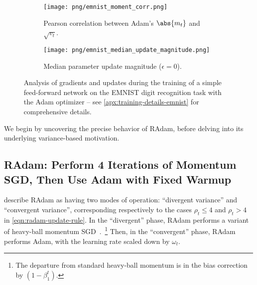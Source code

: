 {\begin{figure*}[ht]
\begin{subfigure}[t]{.3302\linewidth}
  \label{fig:emnist-median-coeff-variation}
\end{subfigure}
\begin{subfigure}[t]{.3302\linewidth}
  \centering

  \captionsetup{
    justification=centering,
    margin=0.1in,
    size=normalsize
  }

  \texttt{[image: png/emnist\_moment\_corr.png]}
  
  \caption{Pearson correlation between Adam's $\abs{m_t}$ and $\sqrt{v_t}$.}
  
  \label{fig:emnist-moment-corr}
\end{subfigure}
\begin{subfigure}[t]{.3302\linewidth}
  \centering

  \captionsetup{
    justification=centering,
    margin=0.1in,
    size=normalsize
  }

  \texttt{[image: png/emnist\_median\_update\_magnitude.png]}
  
  \caption{Median parameter update magnitude ($\epsilon = 0$).}
  
  \label{fig:emnist-median-update-magnitude}
\end{subfigure}

\caption{Analysis of gradients and updates during the training of a simple feed-forward network on the EMNIST digit recognition task with the Adam optimizer -- see \cref{apx:training-details-emnist} for comprehensive details.}

\label{fig:emnist}\end{figure*}

We begin by uncovering the precise behavior of RAdam, before delving into its underlying variance-based motivation.

\subsection{RAdam: Perform 4 Iterations of Momentum SGD, Then Use Adam with Fixed Warmup}

\citeauthor{liu2019radam} describe RAdam as having two modes of operation: ``divergent variance'' and ``convergent variance'', corresponding respectively to the cases $\rho_t \leq 4$ and $\rho_t > 4$ in \cref*{eqn:radam-update-rule}. In the ``divergent'' phase, RAdam performs a variant of heavy-ball momentum SGD~\citep{polyak1964momentum}.~\footnote{The departure from standard heavy-ball momentum is in the bias correction by $(1 - \beta_1^t)$.} Then, in the ``convergent'' phase, RAdam performs Adam, with the learning rate scaled down by $\omega_t$.

}
